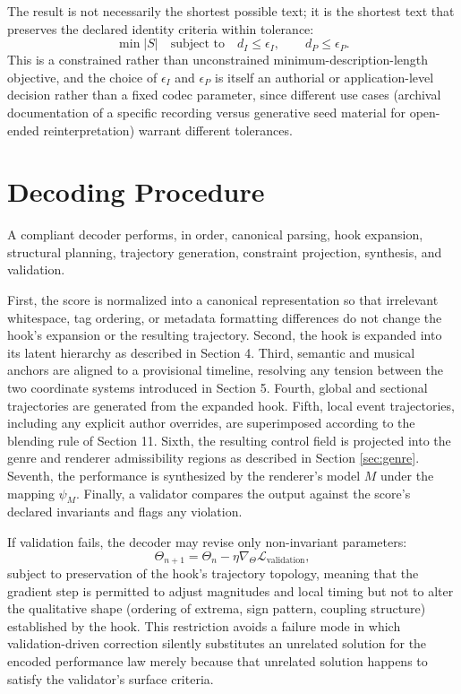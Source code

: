 \documentclass[11pt]{article}
\begin{document}
The result is not necessarily the shortest possible text; it is the shortest text that preserves the declared identity criteria within tolerance:
\[
\min |S|
\quad
\text{subject to}
\quad
d_I\leq\epsilon_I,
\qquad
d_P\leq\epsilon_P.
\]
This is a constrained rather than unconstrained minimum-description-length objective, and the choice of $\epsilon_I$ and $\epsilon_P$ is itself an authorial or application-level decision rather than a fixed codec parameter, since different use cases (archival documentation of a specific recording versus generative seed material for open-ended reinterpretation) warrant different tolerances.

\section{Decoding Procedure}

A compliant decoder performs, in order, canonical parsing, hook expansion, structural planning, trajectory generation, constraint projection, synthesis, and validation.

First, the score is normalized into a canonical representation so that irrelevant whitespace, tag ordering, or metadata formatting differences do not change the hook's expansion or the resulting trajectory. Second, the hook is expanded into its latent hierarchy as described in Section 4. Third, semantic and musical anchors are aligned to a provisional timeline, resolving any tension between the two coordinate systems introduced in Section 5. Fourth, global and sectional trajectories are generated from the expanded hook. Fifth, local event trajectories, including any explicit author overrides, are superimposed according to the blending rule of Section 11. Sixth, the resulting control field is projected into the genre and renderer admissibility regions as described in Section \ref{sec:genre}. Seventh, the performance is synthesized by the renderer's model $M$ under the mapping $\psi_M$. Finally, a validator compares the output against the score's declared invariants and flags any violation.

If validation fails, the decoder may revise only non-invariant parameters:
\[
\Theta_{n+1}
=
\Theta_n
-
\eta\nabla_{\Theta}
\mathcal{L}_{\mathrm{validation}},
\]
subject to preservation of the hook's trajectory topology, meaning that the gradient step is permitted to adjust magnitudes and local timing but not to alter the qualitative shape (ordering of extrema, sign pattern, coupling structure) established by the hook. This restriction avoids a failure mode in which validation-driven correction silently substitutes an unrelated solution for the encoded performance law merely because that unrelated solution happens to satisfy the validator's surface criteria.
\end{document}

